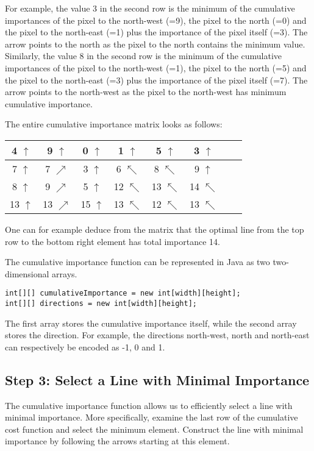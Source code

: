 \documentclass{article}
\newcommand{\co}[1]{#1}
\begin{document}
For example, the value 3 in the second row is the minimum of the cumulative importances of the pixel to the north-west (=9), the pixel to the north (=0) and the pixel to the north-east (=1) plus the importance of the pixel itself (=3). The arrow points to the north as the pixel to the north contains the minimum value. Similarly, the value 8 in the second row is the minimum of the cumulative importances of the pixel to the north-west (=1), the pixel to the north (=5) and the pixel to the north-east (=3) plus the importance of the pixel itself (=7). The arrow points to the north-west as the pixel to the north-west has minimum cumulative importance.

The entire cumulative importance matrix looks as follows:
\begin{center}
\begin{tabular}{| c | c | c | c | c | c | c | c |}
\hline
4 $\uparrow$ & 9 $\uparrow$ & 0 $\uparrow$ & 1 $\uparrow$ & 5 $\uparrow$ & 3 $\uparrow$\\
\hline
7 $\uparrow$ & 7 $\nearrow$   & 3 $\uparrow$  & 6 $\nwarrow$  & 8 $\nwarrow$  & 9 $\uparrow$\\
\hline
8 $\uparrow$  & 9 $\nearrow$  & 5 $\uparrow$  & 12 $\nwarrow$  & 13 $\nwarrow$  & 14 $\nwarrow$ \\
\hline
13 $\uparrow$  & 13 $\nearrow$  & 15 $\uparrow$  & 13 $\nwarrow$  & 12 $\nwarrow$  & 13 $\nwarrow$ \\
\hline
\end{tabular}
\end{center}
One can for example deduce from the matrix that the optimal line from the top row to the bottom right element has total importance 14.

The cumulative importance function can be represented in Java as two two-dimensional arrays.
\begin{lstlisting}
int[][] cumulativeImportance = new int[width][height];
int[][] directions = new int[width][height];
\end{lstlisting}
The first array stores the cumulative importance itself, while the second array stores the direction. For example, the directions north-west, north and north-east can respectively be encoded as \co{-1}, \co{0} and \co{1}.

\subsection*{Step 3: Select a Line with Minimal Importance}
The cumulative importance function allows us to efficiently select a line with minimal importance. More specifically, examine the last row of the cumulative cost function and select the minimum element. Construct the line with minimal importance by following the arrows starting at this element. 
\end{document}
